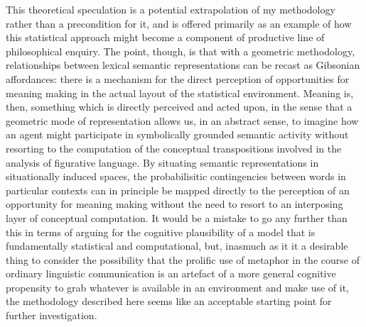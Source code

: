 This theoretical speculation is a potential extrapolation of my methodology rather than a precondition for it, and is offered primarily as an example of how this statistical approach might become a component of productive line of philosophical enquiry.  The point, though, is that with a geometric methodology, relationships between lexical semantic representations can be recast as Gibsonian affordances: there is a mechanism for the direct perception of opportunities for meaning making in the actual layout of the statistical environment.  Meaning is, then, something which is directly perceived and acted upon, in the sense that a geometric mode of representation allows us, in an abstract sense, to imagine how an agent might participate in symbolically grounded semantic activity without resorting to the computation of the conceptual transpositions involved in the analysis of figurative language.    By situating semantic representations in situationally induced spaces, the probabilisitic contingencies between words in particular contexts can in principle be mapped directly to the perception of an opportunity for meaning making without the need to resort to an interposing layer of conceptual computation.  It would be a mistake to go any further than this in terms of arguing for the cognitive plausibility of a model that is fundamentally statistical and computational, but, inasmuch as it it a desirable thing to consider the possibility that the prolific use of metaphor in the course of ordinary linguistic communication is an artefact of a more general cognitive propensity to grab whatever is available in an environment and make use of it, the methodology described here seems like an acceptable starting point for further investigation.

